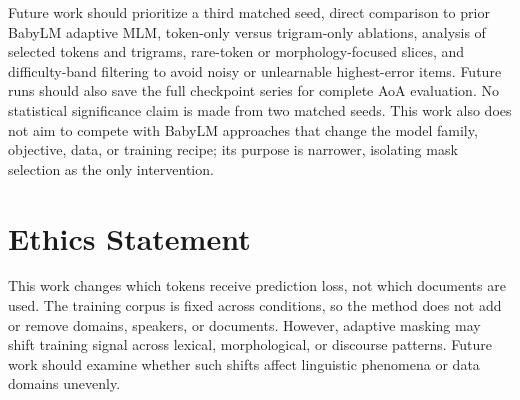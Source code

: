 \documentclass[11pt]{article}
\begin{document}
Future work should prioritize a third matched seed, direct comparison to prior BabyLM adaptive MLM, token-only versus trigram-only ablations, analysis of selected tokens and trigrams, rare-token or morphology-focused slices, and difficulty-band filtering to avoid noisy or unlearnable highest-error items.
Future runs should also save the full checkpoint series for complete AoA evaluation.
No statistical significance claim is made from two matched seeds.
This work also does not aim to compete with BabyLM approaches that change the model family, objective, data, or training recipe; its purpose is narrower, isolating mask selection as the only intervention.

\section*{Ethics Statement}

This work changes which tokens receive prediction loss, not which documents are used.
The training corpus is fixed across conditions, so the method does not add or remove domains, speakers, or documents.
However, adaptive masking may shift training signal across lexical, morphological, or discourse patterns.
Future work should examine whether such shifts affect linguistic phenomena or data domains unevenly.


\end{document}
